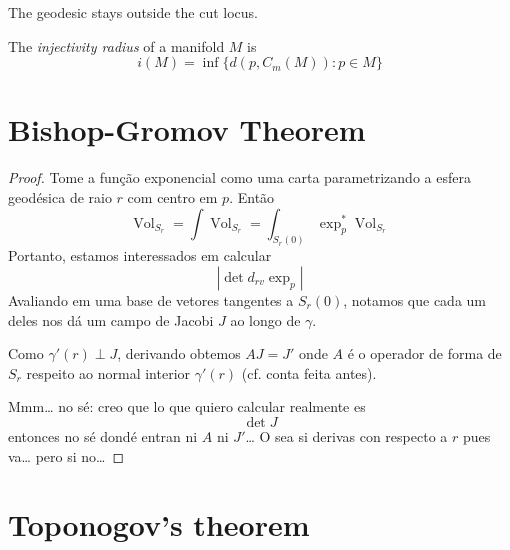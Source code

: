 \begin{lemma}
\label{lemma-cut-locus-topology}

\end{lemma}

\begin{lemma}
\label{lemma-outside-cut-locus-minimizing-geodesic}
The geodesic stays outside the cut locus.
\end{lemma}

\begin{definition}
\label{definition-injectivity-radius}
The {\it injectivity radius} of a manifold $M$ is
$$
i(M)=\operatorname{inf}\{d(p,C_m(M)):p \in M\}
$$
\end{definition}

\section{Bishop-Gromov Theorem}
\label{section-bishop-gromov}

\begin{theorem}
\label{theorem-bishop-gromov}

\end{theorem}

\begin{proof}
Tome a função exponencial como uma carta parametrizando a esfera geodésica de
raio $r$ com centro em $p$. Então
$$
\operatorname{Vol}_{S_r}=\int
\operatorname{Vol}_{S_r}=
\int_{S_r(0)}\operatorname{exp}_p^*\operatorname{Vol}_{S_r}
$$
Portanto, estamos interessados em calcular 
$$
|\det d_{rv} \operatorname{exp}_p|
$$
Avaliando em uma base de vetores tangentes a $S_r(0)$, notamos que cada um deles
nos dá um campo de Jacobi $J$ ao longo de $\gamma$.

Como $\gamma'(r)\perp J$, derivando obtemos $A J=J'$ onde $A$ é o operador de
forma de $S_r$ respeito ao normal interior $\gamma'(r)$ (cf. conta feita antes).

Mmm… no sé: creo que lo que quiero calcular realmente es
$$
\det J
$$
entonces no sé dondé entran ni $A$ ni $J'$… O sea si derivas con respecto a $r$
pues va… pero si no…

\end{proof}

\section{Toponogov's theorem}
\label{section-toponogov}

